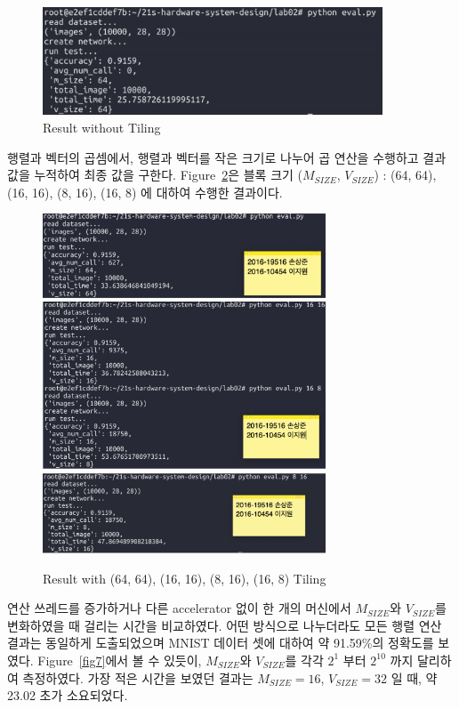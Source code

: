 \documentclass{article}
\begin{document}
\begin{figure}[ht]
	\centering
	\includegraphics[width=0.9\textwidth]{fig3.png}
	\caption{Result without Tiling}
\label{fig3}
\end{figure}

\newpage
행렬과 벡터의 곱셈에서, 행렬과 벡터를 작은 크기로 나누어 곱 연산을 수행하고 결과값을 누적하여 최종 값을 구한다. 
Figure~\ref{fig4}은 블록 크기 ($M_{SIZE}$, $V_{SIZE}$) : (64, 64), (16, 16), (8, 16), (16, 8) 에 대하여 수행한 결과이다.

\begin{figure}[ht]
	\centering
	\includegraphics[width=0.75\textwidth]{fig4.png}
	\includegraphics[width=0.75\textwidth]{fig5.png}
	\includegraphics[width=0.75\textwidth]{fig6.png}
	\caption{Result with (64, 64), (16, 16), (8, 16), (16, 8) Tiling}
\label{fig4}
\end{figure}

연산 쓰레드를 증가하거나 다른 accelerator 없이 한 개의 머신에서 $M_{SIZE}$와 $V_{SIZE}$를 변화하였을 때 걸리는 시간을 비교하였다. 어떤 방식으로 나누더라도 모든 행렬 연산 결과는 동일하게 도출되었으며 MNIST 데이터 셋에 대하여 약 91.59\%의 정확도를 보였다. Figure~\ref{fig7}에서 볼 수 있듯이, $M_{SIZE}$와 $V_{SIZE}$를 각각 $2^1$ 부터  $2^{10}$ 까지 달리하여 측정하였다. 가장 적은 시간을 보였던 결과는 $M_{SIZE}=16$, $V_{SIZE}=32$ 일 때, 약 23.02 초가 소요되었다.
\end{document}
